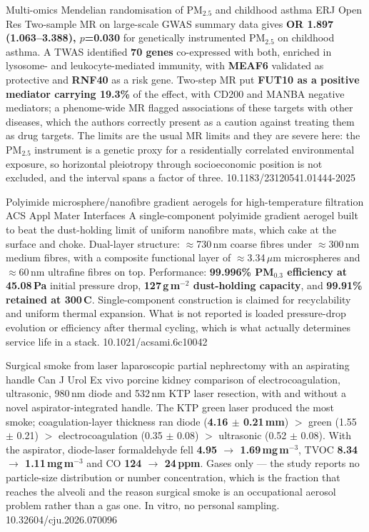 \documentclass[10pt]{article}
\begin{document}

{Multi-omics Mendelian randomisation of PM$_{2.5}$ and childhood asthma}
{ERJ Open Res}
{Two-sample MR on large-scale GWAS summary data gives \textbf{OR 1.897 (1.063--3.388),
$p$=0.030} for genetically instrumented PM$_{2.5}$ on childhood asthma. A TWAS identified
\textbf{70 genes} co-expressed with both, enriched in lysosome- and leukocyte-mediated
immunity, with \textbf{MEAF6} validated as protective and \textbf{RNF40} as a risk gene.
Two-step MR put \textbf{FUT10 as a positive mediator carrying 19.3\%} of the effect, with
CD200 and MANBA negative mediators; a phenome-wide MR flagged associations of these
targets with other diseases, which the authors correctly present as a caution against
treating them as drug targets. The limits are the usual MR limits and they are severe
here: the PM$_{2.5}$ instrument is a genetic proxy for a residentially correlated
environmental exposure, so horizontal pleiotropy through socioeconomic position is not
excluded, and the interval spans a factor of three.}
{10.1183/23120541.01444-2025}


{Polyimide microsphere/nanofibre gradient aerogels for high-temperature filtration}
{ACS Appl Mater Interfaces}
{A single-component polyimide gradient aerogel built to beat the dust-holding limit of
uniform nanofibre mats, which cake at the surface and choke. Dual-layer structure:
$\approx$730\,nm coarse fibres under $\approx$300\,nm medium fibres, with a composite
functional layer of $\approx$3.34\,$\mu$m microspheres and $\approx$60\,nm ultrafine
fibres on top. Performance: \textbf{99.996\% PM$_{0.3}$ efficiency at 45.08\,Pa} initial
pressure drop, \textbf{127\,g\,m$^{-2}$ dust-holding capacity}, and \textbf{99.91\%
retained at 300\,\textdegree C}. Single-component construction is claimed for
recyclability and uniform thermal expansion. What is not reported is loaded pressure-drop
evolution or efficiency after thermal cycling, which is what actually determines service
life in a stack.}
{10.1021/acsami.6c10042}

{Surgical smoke from laser laparoscopic partial nephrectomy with an aspirating handle}
{Can J Urol}
{Ex vivo porcine kidney comparison of electrocoagulation, ultrasonic, 980\,nm diode and
532\,nm KTP laser resection, with and without a novel aspirator-integrated handle. The
KTP green laser produced the most smoke; coagulation-layer thickness ran diode
(\textbf{4.16 $\pm$ 0.21\,mm}) $>$ green (1.55 $\pm$ 0.21) $>$ electrocoagulation
(0.35 $\pm$ 0.08) $>$ ultrasonic (0.52 $\pm$ 0.08). With the aspirator, diode-laser
formaldehyde fell \textbf{4.95 $\to$ 1.69\,mg\,m$^{-3}$}, TVOC \textbf{8.34 $\to$
1.11\,mg\,m$^{-3}$} and CO \textbf{124 $\to$ 24\,ppm}. Gases only --- the study reports no
particle-size distribution or number concentration, which is the fraction that reaches the
alveoli and the reason surgical smoke is an occupational aerosol problem rather than a
gas one. In vitro, no personal sampling.}
{10.32604/cju.2026.070096}
\end{document}
